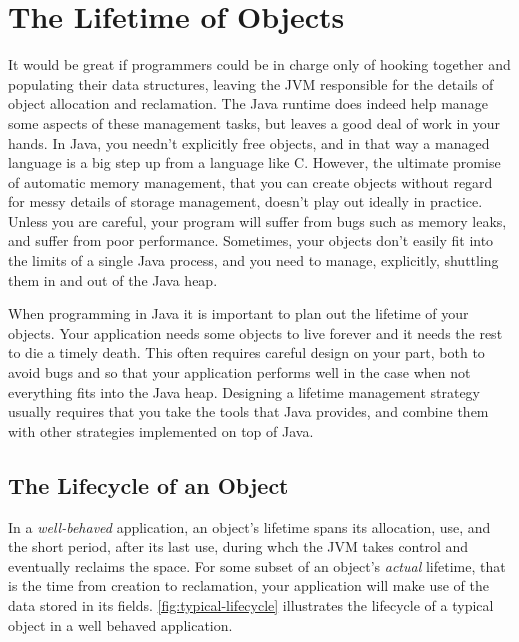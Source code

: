 \chapter{The Lifetime of Objects}

It would be great if programmers could be in charge only of hooking together and
populating their data structures, leaving the JVM responsible for the details of
object allocation and reclamation. The Java runtime does indeed help manage some
aspects of these management tasks, but leaves a good deal of work in your hands.
In Java, you needn't explicitly free objects, and in that way a managed language
is a big step up from a language like C. However, the ultimate promise of
automatic memory management, that you can create objects without regard for messy
details of storage management, doesn't play out ideally in practice. Unless you
are careful, your program will suffer from bugs such as memory leaks, and suffer
from poor performance. Sometimes, your objects don't easily fit into the limits
of a single Java process, and you need to manage, explicitly, shuttling them in
and out of the Java heap.

When programming in Java it is important to plan out the lifetime of your
objects. Your application needs some objects to live forever and it needs the
rest to die a timely death. This often requires careful design on your part, both
to avoid bugs and so that your application performs well in the case when not
everything fits into the Java heap. Designing a lifetime management strategy
usually requires that you take the tools that Java provides, and combine them
with other strategies implemented on top of Java.

\section{The Lifecycle of an Object}

In a \emph{well-behaved} application, an object's lifetime spans its allocation,
use, and the short period, after its last use, during whch the JVM takes control
and eventually reclaims the space. For some subset of an object's {\em actual}
lifetime, that is the time from creation to reclamation, your application will
make use of the data stored in its fields.
\autoref{fig:typical-lifecycle} illustrates the lifecycle of a typical
object in a well behaved application.


